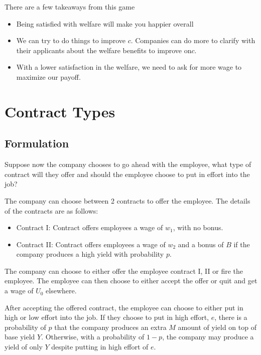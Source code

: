 \documentclass[a4paper, 12pt]{article}
\begin{document}
There are a few takeaways from this game

\begin{itemize}[noitemsep]
    \item Being satisfied with welfare will make you happier overall
    \item We can try to do things to improve $c$. Companies can do more to clarify with their applicants about the welfare benefits to improve on$c$.
    \item With a lower satisfaction in the welfare, we need to ask for more wage to maximize our payoff.
\end{itemize}

\section{Contract Types}

\subsection{Formulation}

Suppose now the company chooses to go ahead with the employee, what type of contract will they offer and should the employee choose to put in effort into the job?

The company can choose between 2 contracts to offer the employee. The details of the contracts are as follows:

\begin{itemize}[noitemsep]
    \item Contract I: Contract offers employees a wage of $w_1$, with no bonus. 
    \item Contract II: Contract offers employees a wage of $w_2$ and a bonus of $B$ if the company produces a high yield with probability $p$. 
\end{itemize}

The company can choose to either offer the employee contract I, II or fire the employee. The employee can then choose to either accept the offer or quit and get a wage of $U_0$ elsewhere. 

After accepting the offered contract, the employee can choose to either put in high or low effort into the job. If they choose to put in high effort, $e$, there is a probability of $p$ that the company produces an extra $M$ amount of yield on top of base yield $Y$. Otherwise, with a probability of $1-p$, the company may produce a yield of only $Y$ despite putting in high effort of $e$. 
\end{document}
